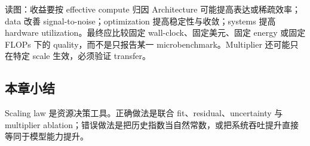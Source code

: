 
\begin{knowledgebox}{读图：收益要按 effective compute 归因}
Architecture 可能提高表达或稀疏效率；data 改善 signal-to-noise；optimization 提高稳定性与收敛；systems 提高 hardware utilization。最终应比较固定 wall-clock、固定美元、固定 energy 或固定 FLOPs 下的 quality，而不是只报告某一 microbenchmark。Multiplier 还可能只在特定 scale 生效，必须验证 transfer。
\end{knowledgebox}


\subsection{本章小结}

Scaling law 是资源决策工具。正确做法是联合 fit、residual、uncertainty 与 multiplier ablation；错误做法是把历史指数当自然常数，或把系统吞吐提升直接等同于模型能力提升。

